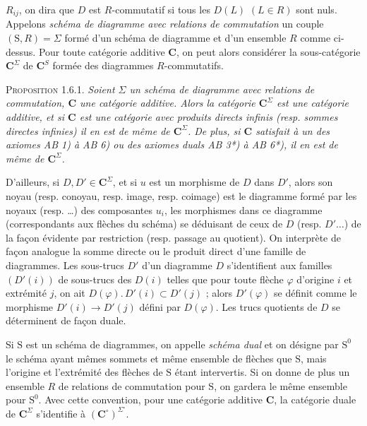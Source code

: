
\noindent $R_{ij}$, on dira que $D$ est $R$-commutatif si tous les $D(L)$
$(L\in R)$ sont nuls. Appelons \textit{schéma de diagramme avec relations de
commutation} un couple $(\mathrm{S},R)=\Sigma$ formé d'un schéma de diagramme et d'un
ensemble $R$ comme ci-dessus. Pour toute catégorie additive $\mathbf{C}$, on peut alors
considérer la sous-catégorie $\mathbf{C}^\Sigma$ de $\mathbf{C}^S$ formée des diagrammes
$R$-commutatifs.

\textsc{Proposition 1.6.1.} \textit{Soient $\Sigma$ un schéma de
diagramme avec relations de commutation, $\mathbf{C}$ une catégorie additive. Alors la
catégorie $\mathbf{C}^\Sigma$ est une catégorie additive, et si $\mathbf{C}$ est une catégorie
avec produits directs infinis (resp. sommes directes infinies) il en est de
même de $\mathbf{C}^\Sigma$. De plus, si $\mathbf{C}$ satisfait à un des axiomes \textup{AB 1)} à \textup{AB 6)}
ou des axiomes duals \textup{AB 3*)} à \textup{AB 6*)}, il en est de même de $\mathbf{C}^\Sigma$.}

D'ailleurs, si $D,D'\in \mathbf{C}^\Sigma$, et si $u$ est un morphisme de $D$ dans
$D'$, alors son noyau (resp. conoyau, resp. image, resp. coimage) est le
diagramme formé par les noyaux (resp. \ldots) des composantes $u_i$, les
morphismes dans ce diagramme (correspondants aux flèches du schéma) se
déduisant de ceux de $D$ (resp. $D'\ldots$) de la façon évidente par
restriction (resp. passage au quotient). On interprète de façon analogue la
somme directe ou le produit direct d'une famille de diagrammes. Les sous-trucs
$D'$ d'un diagramme $D$ s'identifient aux familles $(D'(i))$ de sous-trucs des
$D(i)$ telles que pour toute flèche $\varphi$ d'origine $i$ et extrémité $j$,
on ait $D(\varphi).\,D'(i)\subset D'(j)$ ; alors $D'(\varphi)$ se définit comme
le morphisme $D'(i)\to D'(j)$ défini par $D(\varphi)$. Les trucs
quotients de $D$ se déterminent de façon duale.

Si $\mathrm{S}$ est un schéma de diagrammes, on appelle \textit{schéma dual} et on
désigne par $\mathrm{S}^0$ le schéma ayant mêmes sommets et même ensemble de flèches
que $\mathrm{S}$, mais l'origine et l'extrémité des flèches de $\mathrm{S}$ étant intervertis. Si
on donne de plus un ensemble $R$ de relations de commutation pour $\mathrm{S}$, on
gardera le même ensemble pour $\mathrm{S}^0$. Avec cette convention, pour une
catégorie additive $\mathbf{C}$, la catégorie duale de $\mathbf{C}^\Sigma$ s'identifie à
$(\mathbf{C}^\circ)^{\Sigma^\circ}$.

